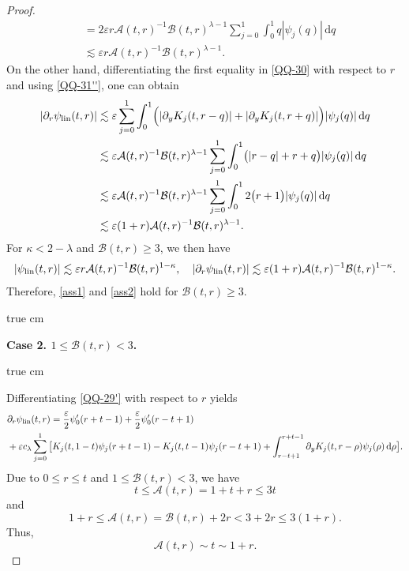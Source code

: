 \documentclass[11pt,twoside]{article}
\newcommand{\p}{\partial}
\newcommand{\ve}{\varepsilon}
\newcommand{\f}{\frac}
\newcommand{\Acal}{\mathcal A}
\newcommand{\Bcal}{\mathcal B}
\newcommand{\dd}{\,\mathrm{d}}
\theoremstyle{plain}
\theoremstyle{definition}
\theoremstyle{remark}
\numberwithin{equation}{section}
\begin{document}
\begin{proof}
\begin{equation}
\begin{aligned}
&=2\ve r\Acal(t,r)^{-1}\Bcal(t,r)^{\lambda-1}
\sum_{j=0}^1
\int_0^1q|\psi_j(q)|\dd q\\
&\lesssim
\ve r\Acal(t,r)^{-1}\Bcal(t,r)^{\lambda-1}.
\end{aligned}
\end{equation}
On the other hand, differentiating the first equality in \eqref{QQ-30} with respect
to $r$ and using \eqref{QQ-31''}, one can obtain
\[
\begin{aligned}
|\p_r\psi_{\rm lin}(t,r)|
&\lesssim
\ve\sum_{j=0}^1\int_0^1
\Bigl(
|\p_yK_j(t,r-q)|
+|\p_yK_j(t,r+q)|
\Bigr)
|\psi_j(q)|\dd q\\
&\lesssim
\ve\Acal(t,r)^{-1}\Bcal(t,r)^{\lambda-1}
\sum_{j=0}^1
\int_0^1
\bigl(|r-q|+r+q\bigr)|\psi_j(q)|\dd q\\
&\lesssim
\ve\Acal(t,r)^{-1}\Bcal(t,r)^{\lambda-1}
\sum_{j=0}^1
\int_0^1 2
\bigl(r+1\bigr)|\psi_j(q)|\dd q\\
&\lesssim
\ve(1+r)
\Acal(t,r)^{-1}\Bcal(t,r)^{\lambda-1}.
\end{aligned}
\]
For $\kappa<2-\lambda$ and $\Bcal(t,r)\geq3$, we then have
\begin{equation}\label{QQ-32'}
\begin{aligned}
|\psi_{\rm lin}(t,r)|
\lesssim
\ve r\Acal(t,r)^{-1}\Bcal(t,r)^{1-\kappa},
\quad
|\p_r\psi_{\rm lin}(t,r)|
\lesssim
\ve(1+r)\Acal(t,r)^{-1}\Bcal(t,r)^{1-\kappa}.
\end{aligned}
\end{equation}
Therefore, \eqref{ass1} and \eqref{ass2} hold for
$\Bcal(t,r)\geq3$.

 true cm

{\bf Case 2. $1\leq\Bcal(t,r)<3$.}

 true cm

Differentiating \eqref{QQ-29'} with respect to $r$ yields
\begin{equation}\label{YHC-07}
\begin{aligned}
&\p_r\psi_{\rm lin}(t,r)
=\f{\ve}{2}\psi_0'(r+t-1)
+\f{\ve}{2}\psi_0'(r-t+1)\\
&+\ve c_\lambda
\sum_{j=0}^1
\big[K_j(t,1-t)\psi_j(r+t-1)
-K_j(t,t-1)\psi_j(r-t+1)
+\int_{r-t+1}^{r+t-1}
\p_yK_j(t,r-\rho)\psi_j(\rho)\dd\rho
\big].
\end{aligned}
\end{equation}
Due to $0\leq r\leq t$ and $1\leq\Bcal(t,r)<3$, we have
\[
t\leq\Acal(t,r)=1+t+r\leq3t
\]
and
\[
1+r
\leq
\Acal(t,r)
=
\Bcal(t,r)+2r
<
3+2r
\leq
3(1+r).
\]
Thus,
\begin{equation}\label{QQ-34}
\Acal(t,r)\sim t\sim1+r.
\end{equation}


\end{proof}
\end{document}
